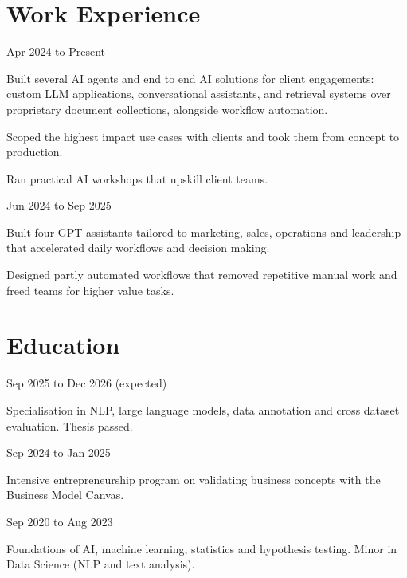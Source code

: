 \documentclass[10pt]{article}
\newcommand{\entry}[2]{\vspace{2pt}{\bfseries #1}\hfill{\small\color{gray}#2}\par}
\begin{document}
\section*{Work Experience}
\entry{AI Engineer \,\textbar\, Vervai}{Apr 2024 to Present}
\begin{tights}
  \item Built several AI agents and end to end AI solutions for client engagements: custom LLM applications, conversational assistants, and retrieval systems over proprietary document collections, alongside workflow automation.
  \item Scoped the highest impact use cases with clients and took them from concept to production.
  \item Ran practical AI workshops that upskill client teams.
\end{tights}
\entry{Innovation Consultant \,\textbar\, Daffee}{Jun 2024 to Sep 2025}
\begin{tights}
  \item Built four GPT assistants tailored to marketing, sales, operations and leadership that accelerated daily workflows and decision making.
  \item Designed partly automated workflows that removed repetitive manual work and freed teams for higher value tasks.
\end{tights}

\section*{Education}
\entry{MA Language \& AI \,\textbar\, Vrije Universiteit Amsterdam}{Sep 2025 to Dec 2026 (expected)}
\begin{tights}
  \item Specialisation in NLP, large language models, data annotation and cross dataset evaluation. Thesis passed.
\end{tights}
\entry{Amsterdam Startup Launch Program \,\textbar\, Vrije Universiteit Amsterdam}{Sep 2024 to Jan 2025}
\begin{tights}
  \item Intensive entrepreneurship program on validating business concepts with the Business Model Canvas.
\end{tights}
\entry{BSc Artificial Intelligence \,\textbar\, Vrije Universiteit Amsterdam}{Sep 2020 to Aug 2023}
\begin{tights}
  \item Foundations of AI, machine learning, statistics and hypothesis testing. Minor in Data Science (NLP and text analysis).
\end{tights}
\end{document}
